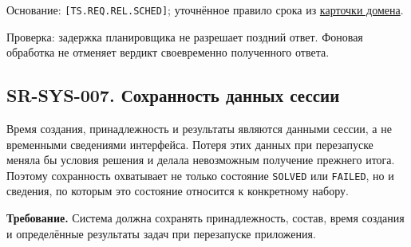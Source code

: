 \documentclass[12pt,a4paper]{article}
\begin{document}
Основание: \texttt{{[}TS.REQ.REL.SCHED{]}}; уточнённое правило срока из \href{../notes/domains/\%D0\%A1\%D0\%B5\%D1\%81\%D1\%81\%D0\%B8\%D0\%B8_\%D0\%B7\%D0\%B0\%D0\%B4\%D0\%B0\%D1\%87.pdf\#nameddest=\%D0\%BA\%D0\%B0\%D1\%80\%D1\%82\%D0\%BE\%D1\%87\%D0\%BA\%D0\%B0-\%D0\%B4\%D0\%BE\%D0\%BC\%D0\%B5\%D0\%BD\%D0\%B0-\%D1\%81\%D0\%B5\%D1\%81\%D1\%81\%D0\%B8\%D0\%B8-\%D0\%B7\%D0\%B0\%D0\%B4\%D0\%B0\%D1\%87}{карточки домена}.

Проверка: задержка планировщика не разрешает поздний ответ. Фоновая обработка не отменяет вердикт своевременно полученного ответа.

\subsection{SR-SYS-007. Сохранность данных сессии}\label{sr-sys-007-ux441ux43eux445ux440ux430ux43dux43dux43eux441ux442ux44c-ux434ux430ux43dux43dux44bux445-ux441ux435ux441ux441ux438ux438}

\hypertarget{sr-sys-007-сохранность-данных-сессии}{}

Время создания, принадлежность и результаты являются данными сессии, а не временными сведениями интерфейса. Потеря этих данных при перезапуске меняла бы условия решения и делала невозможным получение прежнего итога. Поэтому сохранность охватывает не только состояние \texttt{SOLVED} или \texttt{FAILED}, но и сведения, по которым это состояние относится к конкретному набору.

\textbf{Требование.} Система должна сохранять принадлежность, состав, время создания и определённые результаты задач при перезапуске приложения.
\end{document}
